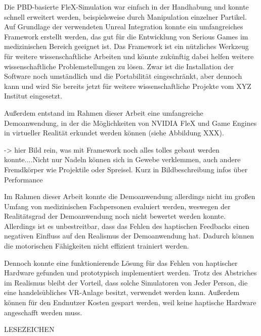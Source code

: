Die PBD-basierte FleX-Simulation war einfach in der Handhabung und konnte schnell erweitert werden, beispielsweise durch Manipulation einzelner Partikel. Auf Grundlage der verwendeten Unreal Integration konnte ein umfangreiches Framework erstellt  werden, das gut für die Entwicklung von Serious Games im medizinischen Bereich geeignet ist.
Das Framework ist ein nützliches Werkzeug für weitere wissenschaftliche Arbeiten und könnte zukünftig dabei helfen weitere wissenschaftliche Problemstellungen zu lösen. Zwar ist die Installation der Software noch umständlich  und die Portabilität eingeschränkt, aber dennoch kann und wird Sie bereits jetzt für weitere wissenschaftliche Projekte vom XYZ Institut eingesetzt. 

Außerdem entstand im Rahmen dieser Arbeit eine umfangreiche Demoanwendung, in der die Möglichkeiten von NVIDIA FleX und Game Engines in virtueller Realität erkundet werden können (siehe Abbildung XXX). 

-> hier Bild rein, was mit Framework noch alles tolles gebaut werden konnte....Nicht nur Nadeln können sich in Gewebe verklemmen, auch andere Fremdkörper wie Projektile oder Spreisel. Kurz in Bildbeschreibung infos über Performance

Im Rahmen dieser Arbeit konnte die Demoanwendung allerdings nicht im großen Umfang von medizinischen Fachpersonen evaluiert werden, weswegen der Realitätsgrad der Demoanwendung noch nicht bewertet werden konnte. 
Allerdings ist es unbestreitbar, dass das Fehlen des haptischen Feedbacks einen negativen Einfluss auf den Realismus der Demoanwendung hat. Dadurch können die motorischen Fähigkeiten nicht effizient trainiert werden. 

Dennoch konnte eine funktionierende Lösung für das Fehlen von haptischer Hardware gefunden und prototypisch implementiert werden. %
Trotz des Abstriches im Realismus bleibt der Vorteil, dass solche Simulatoren von Jeder Person, die eine handelsübliches VR-Anlage besitzt, verwendet werden kann. Außerdem können für den Endnutzer Kosten gespart werden, weil keine haptische Hardware angeschafft werden muss.


LESEZEICHEN



